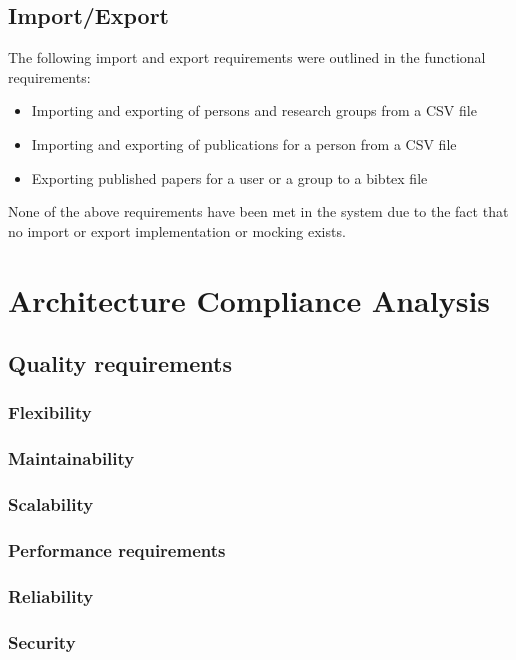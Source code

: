 \documentclass[a4paper,10pt]{article}
\begin{document}
\subsection{Import/Export}
The following import and export requirements were outlined in the functional requirements:
\begin{itemize}
	\item Importing and exporting of persons and research groups from a CSV file
	\item Importing and exporting of publications for a person from a CSV file
	\item Exporting published papers for a user or a group to a bibtex file
\end{itemize}

None of the above requirements have been met in the system due to the fact that no import or export implementation or mocking exists.

\section{Architecture Compliance Analysis}
\subsection{Quality requirements}
\subsubsection{Flexibility}

\subsubsection{Maintainability}

\subsubsection{Scalability}

\subsubsection{Performance requirements}

\subsubsection{Reliability}

\subsubsection{Security}
\end{document}
